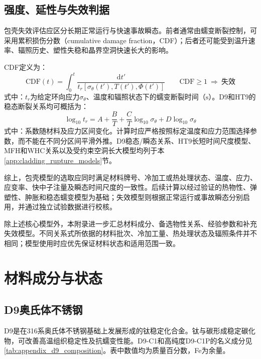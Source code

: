 \subsection{强度、延性与失效判据}
\label{sec:cladding_failure_models}

包壳失效评估应区分长期正常运行与快速事故瞬态。前者通常由蠕变断裂控制，可采用累积损伤分数（cumulative damage fraction，CDF）；后者还可能受到温升速率、辐照历史、塑性失稳和晶界空洞快速长大的影响\cite{FanningSAS4ASASSYS1Safety2017,KARAHAN2010283}。

CDF定义为：
\begin{equation}
	\mathrm{CDF}(t)
	=\int_0^t
	\frac{\mathrm dt'}
	{t_r[\sigma_\theta(t'),T(t'),\varPhi(t')]}
	\qquad
	\mathrm{CDF}\geq1\ \Longrightarrow\ \text{失效}
	\label{eq:clad_cumulative_damage_fraction}
\end{equation}
\noindent 式中：$t_r$为给定环向应力$\sigma_\theta$、温度和辐照状态下的蠕变断裂时间（$\mathrm{s}$）。D9和HT9的稳态断裂关系均可概括为：
\begin{equation}
	\log_{10}t_r
	=A+\frac{B}{T}
	+\frac{C}{T}\log_{10}\sigma_\theta
	+D\log_{10}\sigma_\theta
	\label{eq:clad_generic_rupture_time}
\end{equation}
\noindent 式中：系数随材料及应力区间变化。计算时应严格按照标定温度和应力范围选择参数，而不能在不同分区间平滑外推。D9稳态/瞬态关系、HT9长短时间尺度模型、MFH和WHC关系以及受约束空洞长大模型均列于本\ref{app:cladding_rupture_models}节。

综上，包壳模型的选取应同时满足材料牌号、冷加工或热处理状态、温度、应力、应变率、快中子注量及瞬态时间尺度的一致性。后续计算以经过验证的热物性、弹塑性、肿胀和稳态蠕变模型为基础；失效模型则根据正常运行或事故瞬态分别启用，并通过独立试验数据进行校核。

除上述核心模型外，本附录进一步汇总材料成分、备选物性关系、经验参数和补充失效模型。不同关系式所依据的材料批次、冷加工量、热处理状态及辐照条件并不相同；模型使用时应优先保证材料状态和适用范围一致。

\section{材料成分与状态}
\label{app:cladding_material_compositions}

\subsection{D9奥氏体不锈钢}

D9是在316系奥氏体不锈钢基础上发展形成的钛稳定化合金。钛与碳形成稳定碳化物，可改善高温组织稳定性及抗蠕变性能。D9-C1和高纯度D9-C1P的名义成分见\tablename\ref{tab:appendix_d9_composition}\cite{hofmanMetallicFuelsHandbook2019}。表中数值均为质量百分数，Fe为余量。

